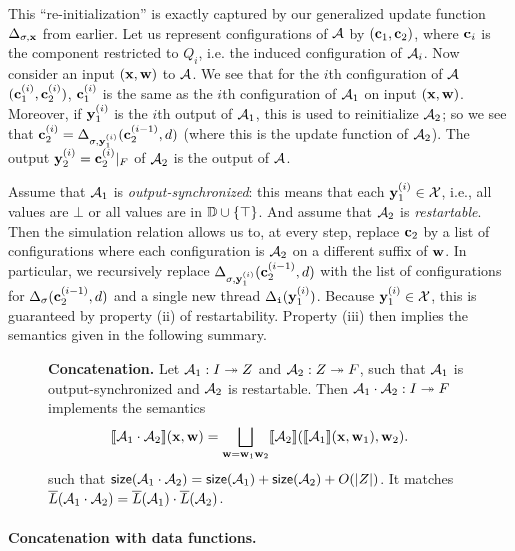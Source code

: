 This ``re-initialization'' is exactly captured by our generalized update function $\Delta_{\sigma, \mathbf{x}}$ from earlier. Let us represent configurations of $\mathcal{A}$ by $(\mathbf{c}_1, \mathbf{c}_2)$, where $\mathbf{c}_i$ is the component restricted to $Q_i$, i.e. the induced configuration of $\mathcal{A}_i$.
Now consider an input $(\mathbf{x},\mathbf{w})$ to $\mathcal{A}$.
We see that for the $i$th configuration of $\mathcal{A}$ $(\mathbf{c}_1^{(i)},\mathbf{c}_2^{(i)})$, $\mathbf{c}_1^{(i)}$ is the same as the $i$th configuration of $\mathcal{A}_1$ on input $(\mathbf{x},\mathbf{w})$.
Moreover, if $\mathbf{y}_1^{(i)}$ is the $i$th output of $\mathcal{A}_1$, this is used to reinitialize $\mathcal{A}_2$;
so we see that $\mathbf{c}_2^{(i)} = \Delta_{\sigma,\mathbf{y}_1^{(i)}}(\mathbf{c}_2^{(i-1)},d)$ (where this is the update function of $\mathcal{A}_2$). The output $\mathbf{y}_2^{(i)} = \mathbf{c}_2^{(i)}|_F$ of $\mathcal{A}_2$ is the output of $\mathcal{A}$.

Assume that $\mathcal{A}_1$ is \emph{output-synchronized}: this means that each $\mathbf{y}_1^{(i)} \in \mathcal{X}$, i.e., all values are $\bot$ or all values are in $\mathbb{D} \cup \{\top\}$. And assume that $\mathcal{A}_2$ is \emph{restartable}. Then the simulation relation allows us to, at every step, replace $\mathbf{c}_2$ by a list of configurations where each configuration is $\mathcal{A}_2$ on a different suffix of $\mathbf{w}$. In particular, we recursively replace $\Delta_{\sigma, \mathbf{y}_1^{(i)}}(\mathbf{c}_2^{(i-1)},d)$ with the list of configurations for $\Delta_\sigma(\mathbf{c}_2^{(i-1)},d)$ and a single new thread $\Delta_{\texttt{i}}(\mathbf{y}_1^{(i)})$. Because $\mathbf{y}_1^{(i)} \in \mathcal{X}$, this is guaranteed by property (ii) of restartability. Property (iii) then implies the semantics given in the following summary.

\begin{figure}[H]
\begin{dtbox}
\textbf{Concatenation.}
Let $\mathcal{A}_1: I \twoheadrightarrow Z$ and $\mathcal{A}_2: Z \twoheadrightarrow F$,
such that $\mathcal{A}_1$ is output-synchronized and $\mathcal{A}_2$ is restartable.
Then $\mathcal{A}_1 \cdot \mathcal{A}_2 : I \twoheadrightarrow F$ implements the semantics
\[
\llbracket \mathcal{A}_1 \cdot \mathcal{A}_2 \rrbracket(\mathbf{x},\mathbf{w}) = \bigsqcup_{\mathbf{w} = \mathbf{w}_1 \mathbf{w}_2} \llbracket \mathcal{A}_2 \rrbracket(\llbracket \mathcal{A}_1 \rrbracket(\mathbf{x},\mathbf{w}_1),\mathbf{w}_2).
\]
such that $\mathsf{size}(\mathcal{A}_1 \cdot \mathcal{A}_2) = \mathsf{size}(\mathcal{A}_1) + \mathsf{size}(\mathcal{A}_2) + O(|Z|)$.
It matches $\overline{L}(\mathcal{A}_1 \cdot \mathcal{A}_2) = \overline{L}(\mathcal{A}_1) \cdot \overline{L}(\mathcal{A}_2)$.
\end{dtbox}

\label{dt:fig:concatenation}
\end{figure}

\paragraph*{Concatenation with data functions.}

